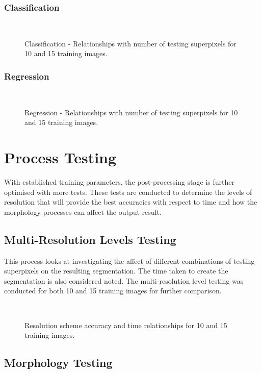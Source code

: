 \subsubsection{Classification}
\begin{figure}[H]
    \centering
    \\
    \caption{Classification - Relationships with number of testing superpixels for 10 and 15 training images.}%
    \label{class:testpix}
\end{figure}

\subsubsection{Regression}
\begin{figure}[H]
    \centering
    \\
    \caption{Regression - Relationships with number of testing superpixels for 10 and 15 training images.}%
    \label{reg:testpix}
\end{figure}

\section{Process Testing}
With established training parameters, the post-processing stage is further optimised with more tests. These tests are conducted to determine the levels of resolution that will provide the best accuracies with respect to time and how the morphology processes can affect the output result.

\subsection{Multi-Resolution Levels Testing}
This process looks at investigating the affect of different combinations of testing superpixels on the resulting segmentation. The time taken to create the segmentation is also considered noted. The multi-resolution level testing was conducted for both 10 and 15 training images for further comparison.
\begin{figure}[H]
    \centering
    \\
    \caption{Resolution scheme accuracy and time relationships for 10 and 15 training images.}%
    \label{reg: multires10}
\end{figure}




\subsection{Morphology Testing} 
